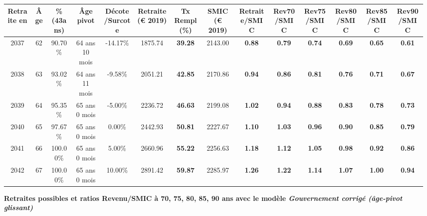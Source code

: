 \begin{adjustbox}{max width=\textwidth} 
\begin{tabular}[htb]{|c|c||c|c|c||c|c||c||c|c|c|c|c|c|} 
\hline 
 Retraite en &  Âge &  \%(43ans) &  Âge pivot &  Décote/Surcote &  Retraite (\euro{} 2019) &  Tx Rempl(\%) &  SMIC (\euro{} 2019) &  Retraite/SMIC &  Rev70/SMIC &  Rev75/SMIC &  Rev80/SMIC &  Rev85/SMIC &  Rev90/SMIC \\ 
\hline \hline 
 2037 &  62 &  90.70\% &  64 ans 10 mois &  -14.17\% &  1875.74 &  {\bf 39.28} &  2143.00 &  {\bf {\color{red} 0.88}} &  {\bf {\color{red} 0.79}} &  {\bf {\color{red} 0.74}} &  {\bf {\color{red} 0.69}} &  {\bf {\color{red} 0.65}} &  {\bf {\color{red} 0.61}} \\ 
\hline 
 2038 &  63 &  93.02\% &  64 ans 11 mois &  -9.58\% &  2051.21 &  {\bf 42.85} &  2170.86 &  {\bf {\color{red} 0.94}} &  {\bf {\color{red} 0.86}} &  {\bf {\color{red} 0.81}} &  {\bf {\color{red} 0.76}} &  {\bf {\color{red} 0.71}} &  {\bf {\color{red} 0.67}} \\ 
\hline 
 2039 &  64 &  95.35\% &  65 ans 0 mois &  -5.00\% &  2236.72 &  {\bf 46.63} &  2199.08 &  {\bf 1.02} &  {\bf {\color{red} 0.94}} &  {\bf {\color{red} 0.88}} &  {\bf {\color{red} 0.83}} &  {\bf {\color{red} 0.78}} &  {\bf {\color{red} 0.73}} \\ 
\hline 
 2040 &  65 &  97.67\% &  65 ans 0 mois &  0.00\% &  2442.93 &  {\bf 50.81} &  2227.67 &  {\bf 1.10} &  {\bf 1.03} &  {\bf {\color{red} 0.96}} &  {\bf {\color{red} 0.90}} &  {\bf {\color{red} 0.85}} &  {\bf {\color{red} 0.79}} \\ 
\hline 
 2041 &  66 &  100.00\% &  65 ans 0 mois &  5.00\% &  2660.96 &  {\bf 55.22} &  2256.63 &  {\bf 1.18} &  {\bf 1.12} &  {\bf 1.05} &  {\bf {\color{red} 0.98}} &  {\bf {\color{red} 0.92}} &  {\bf {\color{red} 0.86}} \\ 
\hline 
 2042 &  67 &  100.00\% &  65 ans 0 mois &  10.00\% &  2891.42 &  {\bf 59.87} &  2285.97 &  {\bf 1.26} &  {\bf 1.22} &  {\bf 1.14} &  {\bf 1.07} &  {\bf 1.00} &  {\bf {\color{red} 0.94}} \\ 
\hline 
\hline 
\end{tabular} 
\end{adjustbox} 
 
 \vspace{0.1cm} 
{\bf \noindent Retraites possibles et ratios Revenu/SMIC à 70, 75, 80, 85, 90 ans avec le modèle \emph{Gouvernement corrigé (âge-pivot glissant)}}  
 

